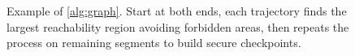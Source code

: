 \documentclass{article}
\newcommand{\news}{\color{blue}}
\begin{document}
\begin{figure}[h]
	\centering
    \caption{\news Example of \cref{alg:graph}. Start at both ends, each trajectory finds the largest reachability region avoiding forbidden areas, then repeats the process on remaining segments to build secure checkpoints.}\label{fig:checkpoint-generate}
\end{figure}
\end{document}
